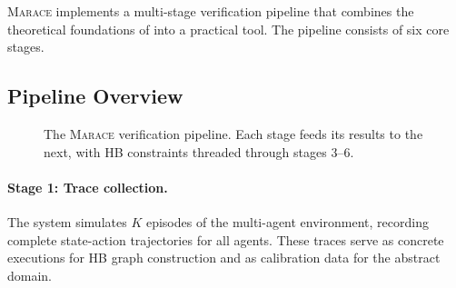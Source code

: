 \documentclass[11pt]{article}
\newcommand{\marace}{\textsc{Marace}}
\begin{document}
\marace{} implements a multi-stage verification pipeline that combines
the theoretical foundations of  into a
practical tool. The pipeline consists of six core stages.

\subsection{Pipeline Overview}

\begin{figure}[t]
\centering
{}
\caption{The \marace{} verification pipeline. Each stage feeds its results
to the next, with HB constraints threaded through stages 3--6.}
\label{fig:pipeline}
\end{figure}

\paragraph{Stage 1: Trace collection.}
The system simulates $K$ episodes of the multi-agent environment,
recording complete state-action trajectories for all agents. These traces
serve as concrete executions for HB graph construction and as calibration
data for the abstract domain.
\end{document}
